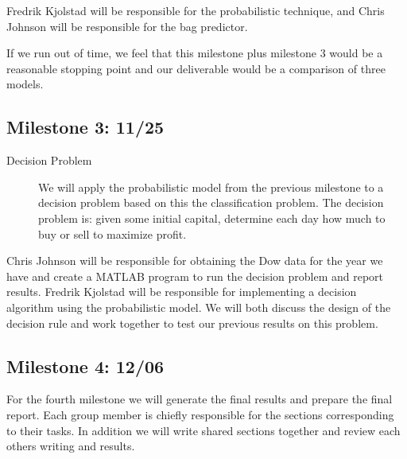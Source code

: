 \documentclass[10pt]{article}
\begin{document}
Fredrik Kjolstad will be responsible for the probabilistic technique, and Chris Johnson will be responsible for the bag predictor.

If we run out of time, we feel that this milestone plus milestone 3 would be a reasonable stopping point and our deliverable would be a comparison of three models.


\subsection{Milestone 3: 11/25}
\begin{description}
\item[Decision Problem] We will apply the probabilistic model from the previous milestone to a decision problem based on this the classification problem. The decision problem is: given some initial capital, determine each day how much to buy or sell to maximize profit.
\end{description}

Chris Johnson will be responsible for obtaining the Dow data for the year we have and create a MATLAB program to run the decision problem and report results.
Fredrik Kjolstad will be responsible for implementing a decision algorithm using the probabilistic model.
We will both discuss the design of the decision rule and work together to test our previous results on this problem.

\subsection{Milestone 4: 12/06}
For the fourth milestone we will generate the final results and prepare the final report. Each group member is chiefly responsible for the sections corresponding to their tasks. In addition we will write shared sections together and review each others writing and results.
\end{document}
